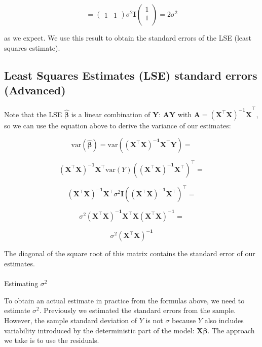 \documentclass[
  letterpaper,
  DIV=11,
  numbers=noendperiod]{scrartcl}
\makeatletter
\let\oldparagraph\paragraph
\renewcommand{\paragraph}{
    \@ifstar
      \xxxParagraphStar
      \xxxParagraphNoStar
  }
\newcommand{\xxxParagraphStar}[1]{\oldparagraph*{#1}\mbox{}}
\newcommand{\xxxParagraphNoStar}[1]{\oldparagraph{#1}\mbox{}}
\makeatother
\begin{document}
\[ =\begin{pmatrix}1&1\end{pmatrix} \sigma^2 \mathbf{I}\begin{pmatrix} 1\\1\\ \end{pmatrix}=2\sigma^2\]

as we expect. We use this result to obtain the standard errors of the
LSE (least squares estimate).

\subsection{Least Squares Estimates (LSE) standard errors
(Advanced)}\label{least-squares-estimates-lse-standard-errors-advanced}

Note that the LSE \(\boldsymbol{\hat{\beta}}\) is a linear combination
of \(\mathbf{Y}\): \(\mathbf{AY}\) with
\(\mathbf{A}=\mathbf{(X^\top X)^{-1}X}^\top\), so we can use the
equation above to derive the variance of our estimates:

\[\mbox{var}(\boldsymbol{\hat{\beta}}) = \mbox{var}(\mathbf{(X^\top X)^{-1}X^\top Y}) =  \]

\[\mathbf{(X^\top X)^{-1} X^\top} \mbox{var}(Y) (\mathbf{(X^\top X)^{-1} X^\top})^\top = \]

\[\mathbf{(X^\top X)^{-1} X^\top} \sigma^2 \mathbf{I} (\mathbf{(X^\top X)^{-1} X^\top})^\top = \]

\[\sigma^2 \mathbf{(X^\top X)^{-1} X^\top}\mathbf{X} \mathbf{(X^\top X)^{-1}} = \]

\[\sigma^2\mathbf{(X^\top X)^{-1}}\]

The diagonal of the square root of this matrix contains the standard
error of our estimates.

\paragraph{\texorpdfstring{Estimating
\(\sigma^2\)}{Estimating \textbackslash sigma\^{}2}}\label{estimating-sigma2}

To obtain an actual estimate in practice from the formulas above, we
need to estimate \(\sigma^2\). Previously we estimated the standard
errors from the sample. However, the sample standard deviation of \(Y\)
is not \(\sigma\) because \(Y\) also includes variability introduced by
the deterministic part of the model: \(\mathbf{X}\boldsymbol{\beta}\).
The approach we take is to use the residuals.
\end{document}

